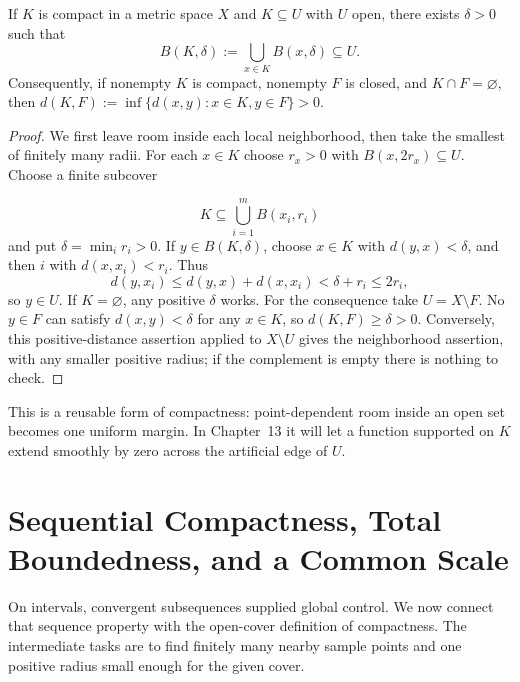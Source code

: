 \begin{proposition}
\label{prop:compact-buffer}
If $K$ is compact in a metric space $X$ and $K\subseteq U$ with $U$ open,
there exists $\delta>0$ such that
\[
B(K,\delta):=\bigcup_{x\in K}B(x,\delta)\subseteq U.
\]
Consequently, if nonempty $K$ is compact, nonempty $F$ is closed, and
$K\cap F=\varnothing$, then
$d(K,F):=\inf\{d(x,y):x\in K,y\in F\}>0$.
\end{proposition}
\begin{proof}
We first leave room inside each local neighborhood, then take the smallest
of finitely many radii. For each $x\in K$ choose $r_x>0$ with
$B(x,2r_x)\subseteq U$. Choose a finite subcover

\[
K\subseteq\bigcup_{i=1}^m B(x_i,r_i)
\]
 and put $\delta=\min_i r_i>0$.
If $y\in B(K,\delta)$, choose $x\in K$ with $d(y,x)<\delta$, and then
$i$ with $d(x,x_i)<r_i$. Thus
\[
d(y,x_i)\leq d(y,x)+d(x,x_i)<\delta+r_i\leq2r_i,
\]
so $y\in U$. If $K=\varnothing$, any positive $\delta$ works.
For the consequence take $U=X\setminus F$. No $y\in F$ can satisfy
$d(x,y)<\delta$ for any $x\in K$, so $d(K,F)\geq\delta>0$.
Conversely, this positive-distance assertion applied to $X\setminus U$
gives the neighborhood assertion, with any smaller positive radius;
if the complement is empty there is nothing to check.
\end{proof}
This is a reusable form of compactness: point-dependent room inside an
open set becomes one uniform margin. In Chapter~13 it will let a function
supported on $K$ extend smoothly by zero across the artificial edge of $U$.

\section{Sequential Compactness, Total Boundedness, and a Common Scale}

On intervals, convergent subsequences supplied global control. We now
connect that sequence property with the open-cover definition of compactness.
The intermediate tasks are to find finitely many nearby sample points and
one positive radius small enough for the given cover.

